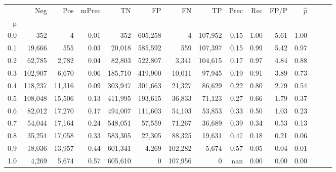 \begin{tabular}{rrrrrrrrrrrrrrr}
\toprule
{} &      Neg &     Pos & mPrec &       TN &       FP &       FN &       TP &  Prec &   Rec &  FP/P & $\hat{p}$ \\
p   &          &         &       &          &          &          &          &       &       &       &           \\
\midrule
0.0 &      352 &       4 &  0.01 &      352 &  605,258 &        4 &  107,952 &  0.15 &  1.00 &  5.61 &      1.00 \\
0.1 &   19,666 &     555 &  0.03 &   20,018 &  585,592 &      559 &  107,397 &  0.15 &  0.99 &  5.42 &      0.97 \\
0.2 &   62,785 &   2,782 &  0.04 &   82,803 &  522,807 &    3,341 &  104,615 &  0.17 &  0.97 &  4.84 &      0.88 \\
0.3 &  102,907 &   6,670 &  0.06 &  185,710 &  419,900 &   10,011 &   97,945 &  0.19 &  0.91 &  3.89 &      0.73 \\
0.4 &  118,237 &  11,316 &  0.09 &  303,947 &  301,663 &   21,327 &   86,629 &  0.22 &  0.80 &  2.79 &      0.54 \\
0.5 &  108,048 &  15,506 &  0.13 &  411,995 &  193,615 &   36,833 &   71,123 &  0.27 &  0.66 &  1.79 &      0.37 \\
0.6 &   82,012 &  17,270 &  0.17 &  494,007 &  111,603 &   54,103 &   53,853 &  0.33 &  0.50 &  1.03 &      0.23 \\
0.7 &   54,044 &  17,164 &  0.24 &  548,051 &   57,559 &   71,267 &   36,689 &  0.39 &  0.34 &  0.53 &      0.13 \\
0.8 &   35,254 &  17,058 &  0.33 &  583,305 &   22,305 &   88,325 &   19,631 &  0.47 &  0.18 &  0.21 &      0.06 \\
0.9 &   18,036 &  13,957 &  0.44 &  601,341 &    4,269 &  102,282 &    5,674 &  0.57 &  0.05 &  0.04 &      0.01 \\
1.0 &    4,269 &   5,674 &  0.57 &  605,610 &        0 &  107,956 &        0 &   nan &  0.00 &  0.00 &      0.00 \\
\bottomrule
\end{tabular}
